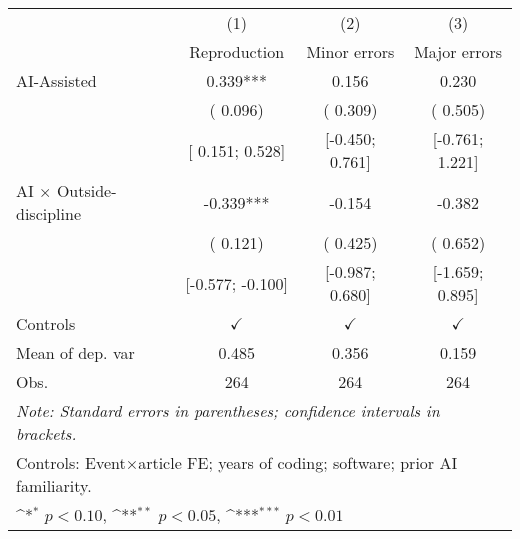 \def\sym#1{\ifmmode^{#1}\else\(^{#1}\)\fi}
\begin{tabular}{l*{3}{c}}
\hline\hline
 & (1) & (2) & (3)
\\
 & Reproduction & Minor errors & Major errors
 \\
\hline
AI-Assisted &  0.339*** &  0.156 &  0.230
\\
 & ( 0.096) & ( 0.309) & ( 0.505)
\\
 & [ 0.151;  0.528] & [-0.450;  0.761] & [-0.761;  1.221]
\\
AI × Outside-discipline & -0.339*** & -0.154 & -0.382
\\
 & ( 0.121) & ( 0.425) & ( 0.652)
\\
 & [-0.577; -0.100] & [-0.987;  0.680] & [-1.659;  0.895]
\\
\hline
Controls & $\checkmark$ & $\checkmark$ & $\checkmark$
\\
Mean of dep. var &  0.485 &  0.356 &  0.159
\\
Obs. & 264 & 264 & 264
\\
\hline
\hline\hline
\multicolumn{4}{l}{\it{Note:} Standard errors in parentheses; confidence intervals in brackets.}\\
\multicolumn{4}{l}{Controls: Event×article FE; years of coding; software; prior AI familiarity.}\\
\multicolumn{4}{l}{\sym{*} $p<0.10$, \sym{**} $p<0.05$,  \sym{***} $p<0.01$}\\
\end{tabular}
